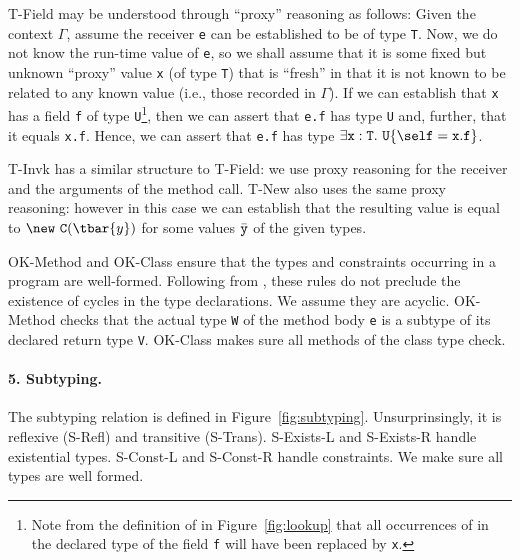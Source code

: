 {\sc T-Field} may be understood through ``proxy'' reasoning as
follows:  Given the context $\Gamma$, assume the receiver {\tt e} can
be established to be of type {\tt T}. Now, we do not know the run-time
value of {\tt e}, so we shall assume that it is some fixed but unknown
``proxy'' value {\tt x} (of type {\tt T}) that is ``fresh'' in that it
is not known to be related to any known value (i.e., those recorded
in $\Gamma$).  If we can establish that {\tt x} has a field {\tt f} of
type {\tt U}\footnote{Note from the definition of
\fields{} in Figure~\ref{fig:lookup} that all occurrences of
\this{} in the declared type of the field {\tt f} will have been replaced
by {\tt x}.}, then we can assert that
{\tt e.f} has type {\tt U} and, further, that it equals {\tt x.f}.
Hence, we can assert that {\tt e.f} has type 
$\exists {\tt x}:{\tt T}.~{\tt U}\{\self={\tt x}.{\tt f}\}$.

{\sc T-Invk} has a similar structure to {\sc T-Field}: we use
proxy reasoning for the receiver and the arguments of the method
call. {\sc T-New} also uses the same proxy reasoning: however in this case
we can establish that the resulting value is equal to $\new~{\tt C}(\tbar{y})$
for some values $\bar{\tt y}$ of the given types.

{\sc OK-Method} and {\sc OK-Class} ensure that the types and constraints occurring in a program are well-formed. Following from \FJ{}, these rules do not preclude the existence of cycles in the type declarations. We assume they are acyclic. {\sc OK-Method} checks that the actual type {\tt W} of the method body {\tt e} is a subtype of its declared return type {\tt V}. {\sc OK-Class} makes sure all methods of the class type check.


\paragraph{5. Subtyping.} The subtyping relation is defined in Figure~\ref{fig:subtyping}.
Unsurprinsingly, it is reflexive ({\sc S-Refl}) and transitive ({\sc S-Trans}).
{\sc S-Exists-L} and {\sc S-Exists-R} handle existential types.
{\sc S-Const-L} and {\sc S-Const-R} handle constraints. We make sure all types are well formed.


